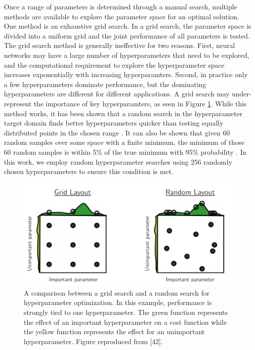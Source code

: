 Once a range of parameters is determined through a manual search, multiple methods are available to explore the parameter space for an optimal solution. One method is an exhaustive grid search. In a grid search, the parameter space is divided into a uniform grid and the joint performance of all parameters is tested. The grid search method is generally ineffective for two reasons. First, neural networks may have a large number of hyperparameters that need to be explored, and the computational requirement to explore the hyperparameter space increases exponentially with increasing hyperparamters. Second, in practice only a few hyperparameters dominate performance, but the dominating hyperparameters are different for different applications. A grid search may under-represent the importance of key hyperparamters, as seen in Figure \ref{fig:Bergstra12a_hyperparameter_grid_vs_random}.  While this method works, it has been shown that a random search in the hyperparameter target domain finds better hyperparameters quicker than testing equally distributed points in the chosen range \cite{Bergstra2012}. It can also be shown that given 60 random samples over some space with a finite minimum, the minimum of those 60 random samples is within 5\% of the true minimum with 95\% probability \cite{Zheng2015}. In this work, we employ random hyperparameter searches using 256 randomly chosen hyperparameters to ensure this condition is met.

\begin{figure}[H]
	\centering
	\includegraphics[width=0.99\linewidth]{images/Bergstra12a_hyperparameter_grid_vs_random}
	\caption{A comparison between a grid search and a random search for hyperparameter optimization. In this example, performance is strongly tied to one hyperparameter. The green function represents the effect of an important hyperparameter on a cost function while the yellow function represents the effect for an unimportant hyperparameter. Figure reproduced from [42].}
	\label{fig:Bergstra12a_hyperparameter_grid_vs_random}
\end{figure}


